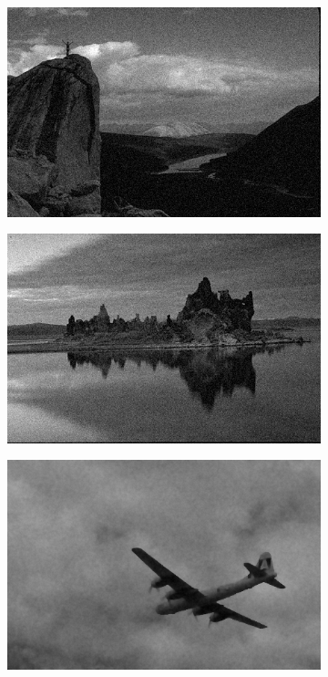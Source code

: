 \documentclass[onecolumn,final,a4paper,13pt,reqno]{siamart}
\begin{document}
\begin{figure}[h]
\begin{subfigure}[t]{0.19\textwidth}
	\end{subfigure}
	\begin{subfigure}[t]{0.19\textwidth}
		\includegraphics[scale=0.175]{pictures/denoising/image/14037_tilde.png}
	\end{subfigure}
	\begin{subfigure}[t]{0.19\textwidth}
		\includegraphics[scale=0.175]{pictures/denoising/image/143090_tilde.png}
	\end{subfigure}
	\begin{subfigure}[t]{0.19\textwidth}
		\includegraphics[scale=0.175]{pictures/denoising/image/3096_ipiano_absolute.png}

\end{subfigure}
\end{figure}
\end{document}
